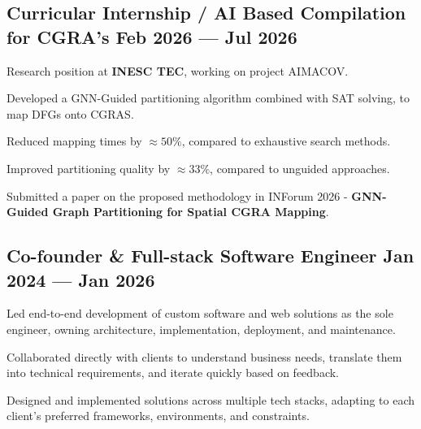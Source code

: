 \subsection{{Curricular Internship / AI Based Compilation for CGRA's \hfill Feb 2026 --- Jul 2026}}
\begin{zitemize}
    \item Research position at \textbf{INESC TEC}, working on project AIMACOV.
    \item Developed a GNN-Guided partitioning algorithm combined with SAT solving, to map DFGs onto CGRAS.
    \item Reduced mapping times by $ \approx 50\% $, compared to exhaustive search methods.
    \item Improved partitioning quality by $ \approx 33\% $, compared to unguided approaches.
    \item Submitted a paper on the proposed methodology in INForum 2026 - \textbf{GNN-Guided Graph Partitioning for Spatial CGRA Mapping}.
\end{zitemize}

\subsection{{Co-founder \& Full-stack Software Engineer \hfill Jan 2024 --- Jan 2026}}
\begin{zitemize}
    \item Led end-to-end development of custom software and web solutions as the sole engineer, owning
architecture, implementation, deployment, and maintenance.
    \item Collaborated directly with clients to understand business needs, translate them into technical requirements, and
iterate quickly based on feedback.
    \item Designed and implemented solutions across multiple tech stacks, adapting to each client’s preferred frameworks,
environments, and constraints.
\end{zitemize}

